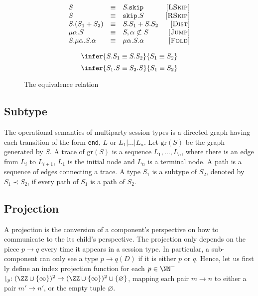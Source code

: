 \begin{figure}
  \begin{center}
    \begin{minipage}{0.48\textwidth}
      $$\begin{array}{lclr}
          S                    & \equiv & S.\texttt{skip}        & \textsc{[LSkip]}
          \\
          S                    & \equiv & \texttt{skip}.S        & \textsc{[RSkip]}
          \\
          S.(S_1+S_2)          & \equiv & S.S_1 + S.S_2          & \textsc{[Dist]}
          \\
          \mu\alpha.S          & \equiv & S, \alpha\not\subset S & \textsc{[Jump]}  \\
          S.\mu\alpha.S.\alpha & \equiv & \mu\alpha.S.\alpha     & \textsc{[Fold]}  \\
        \end{array}$$
    \end{minipage}
    \hfill
    \begin{minipage}{0.48\textwidth}
      $$\infer{S.S_1\equiv S.S_2}{S_1\equiv S_2}$$
      $$\infer{S_1.S\equiv S_2.S}{S_1\equiv S_2}$$
    \end{minipage}
  \end{center}


  \caption{The equivalence relation}
  \label{rules:equivalence}
\end{figure}

\subsection{Subtype}

The operational semantics of multiparty session types is a directed graph having each transition of the form \texttt{end}, $L$ or $L_1|\ldots|L_n$. Let $\text{gr}(S)$ be the graph generated by $S$. A trace of $\text{gr}(S)$ is a sequence $L_1,\ldots,L_n$, where there is an edge from $L_i$ to $L_{i+1}$, $L_1$ is the initial node and $L_n$ is a terminal node. A path is a sequence of edges connecting a trace. A type $S_1$ is a subtype of $S_2$, denoted by $S_1\prec S_2$, if every path of $S_1$ is a path of $S_2$.

\subsection{Projection}

A projection is the conversion of a component's perspective on how to communicate to the its child's perspective. The projection only depends on the piece $p\to q$ every time it appears in a session type. In particular, a sub-component can only see a type $p\rightarrow q(D)$ if it is either $p$ or $q$. Hence, let us first ly define an index projection function for each $p\in\NN^{-}$ $\downharpoonright_p:(\ZZ\cup\{\infty\})^2 \to (\ZZ\cup\{\infty\})^2 \cup\{\varnothing\}$, mapping each pair $m\to n$ to either a pair $m'\to n'$, or the empty tuple $\varnothing$.

